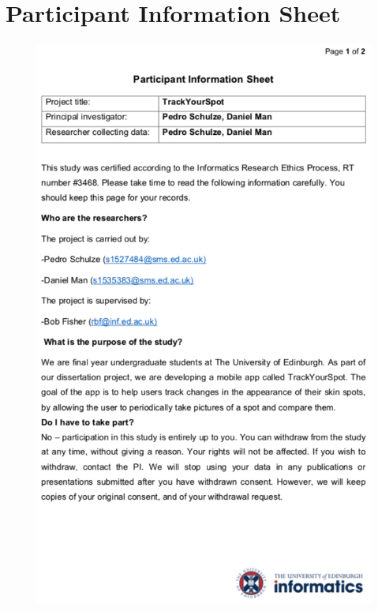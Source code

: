 \chapter{Participant Information Sheet}
\newpage
\begin{figure}[H]
    \includegraphics[width=1\textwidth, center]{figures/participantinfosheet.png}
\end{figure}
